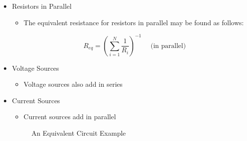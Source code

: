 \begin{itemize}
\begin{itemize}
    \end{itemize}

  \item Resistors in Parallel

    \begin{itemize}

      \item The equivalent resistance for resistors in parallel may be found as follows:

        $$\boxed{R_{eq}=\left(\sum_{i=1}^N \frac{1}{R_i}\right)^{-1}\,\,\,\,\,\,\,\,\text{(in parallel)}}$$

    \end{itemize}

  \item Voltage Sources

    \begin{itemize}

      \item Voltage sources also add in series

    \end{itemize}

  \item Current Sources

    \begin{itemize}

      \item Current sources add in parallel

    \end{itemize}

    \begin{figure}[h]
      \centering
      
      \caption{An Equivalent Circuit Example}
      \label{fig:2}
    \end{figure}

\end{itemize}



